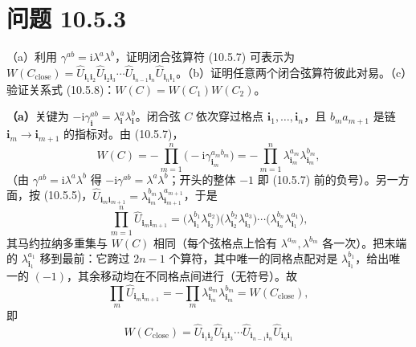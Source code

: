 \section*{问题 10.5.3}
\begin{problem}
（a）利用 $\gamma^{ab}=\mathrm{i}\lambda^{a}\lambda^{b}$，证明闭合弦算符 (10.5.7) 可表示为 $W(C_{\text{close}})=\hat U_{\pmb i_1\pmb i_2}\hat U_{\pmb i_2\pmb i_3}\cdots\hat U_{\pmb i_{n-1}\pmb i_n}\hat U_{\pmb i_n\pmb i_1}$。（b）证明任意两个闭合弦算符彼此对易。（c）验证关系式 (10.5.8)：$W(C)=W(C_1)W(C_2)$。
\end{problem}
\solution
\textbf{（a）}关键为 $-\mathrm{i}\gamma_{\pmb i}^{ab}=\lambda_{\pmb i}^{a}\lambda_{\pmb i}^{b}$。闭合弦 $C$ 依次穿过格点 $\pmb i_1,\dots,\pmb i_n$，且 $b_ma_{m+1}$ 是链 $\pmb i_m\to\pmb i_{m+1}$ 的指标对。由 (10.5.7)，
\begin{equation*}
W(C)=-\prod_{m=1}^{n}\big(-\mathrm{i}\gamma_{\pmb i_m}^{a_mb_m}\big)
=-\prod_{m=1}^{n}\lambda_{\pmb i_m}^{a_m}\lambda_{\pmb i_m}^{b_m},
\end{equation*}
（由 $\gamma^{ab}=\mathrm{i}\lambda^{a}\lambda^{b}$ 得 $-\mathrm i\gamma^{ab}=\lambda^{a}\lambda^{b}$；开头的整体 $-1$ 即 (10.5.7) 前的负号）。另一方面，按 (10.5.5)，$\hat U_{\pmb i_m\pmb i_{m+1}}=\lambda_{\pmb i_m}^{b_m}\lambda_{\pmb i_{m+1}}^{a_{m+1}}$，于是
\begin{equation*}
\prod_{m=1}^{n}\hat U_{\pmb i_m\pmb i_{m+1}}
=\big(\lambda_{\pmb i_1}^{b_1}\lambda_{\pmb i_2}^{a_2}\big)\big(\lambda_{\pmb i_2}^{b_2}\lambda_{\pmb i_3}^{a_3}\big)\cdots\big(\lambda_{\pmb i_n}^{b_n}\lambda_{\pmb i_1}^{a_1}\big),
\end{equation*}
其马约拉纳多重集与 $W(C)$ 相同（每个弦格点上恰有 $\lambda^{a_m},\lambda^{b_m}$ 各一次）。把末端的 $\lambda_{\pmb i_1}^{a_1}$ 移到最前：它跨过 $2n-1$ 个算符，其中唯一的同格点配对是 $\lambda_{\pmb i_1}^{b_1}$，给出唯一的 $(-1)$，其余移动均在不同格点间进行（无符号）。故
\begin{equation*}
\prod_{m}\hat U_{\pmb i_m\pmb i_{m+1}}=-\prod_{m}\lambda_{\pmb i_m}^{a_m}\lambda_{\pmb i_m}^{b_m}=W(C_{\text{close}}),
\end{equation*}
即
\begin{equation*}
\boxed{\;W(C_{\text{close}})=\hat U_{\pmb i_1\pmb i_2}\hat U_{\pmb i_2\pmb i_3}\cdots\hat U_{\pmb i_{n-1}\pmb i_n}\hat U_{\pmb i_n\pmb i_1}\;}
\end{equation*}


